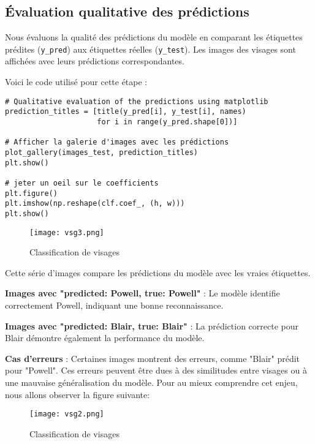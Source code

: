 \documentclass{article}
\begin{document}
\begin{itemize}
\subsection{Évaluation qualitative des prédictions}

Nous évaluons la qualité des prédictions du modèle en comparant les 
étiquettes prédites (\texttt{y\_pred}) aux étiquettes réelles 
(\texttt{y\_test}). Les images des visages sont affichées avec leurs 
prédictions correspondantes.

Voici le code utilisé pour cette étape :

\begin{verbatim}
# Qualitative evaluation of the predictions using matplotlib
prediction_titles = [title(y_pred[i], y_test[i], names)
                     for i in range(y_pred.shape[0])]

# Afficher la galerie d'images avec les prédictions
plot_gallery(images_test, prediction_titles)
plt.show()

# jeter un oeil sur le coefficients 
plt.figure()
plt.imshow(np.reshape(clf.coef_, (h, w)))
plt.show()

\end{verbatim}

\begin{figure}[H]
    \centering
    \begin{minipage}{0.9\textwidth}
        \centering
        \texttt{[image: vsg3.png]}
        \caption{Classification de visages}
    \end{minipage}
    \end{figure} 
Cette série d'images compare les prédictions du modèle avec les vraies
étiquettes.

\textbf{Images avec "predicted: Powell, true: Powell"} : Le modèle 
identifie correctement Powell, indiquant une bonne reconnaissance.

\textbf{Images avec "predicted: Blair, true: Blair"} : La prédiction 
correcte pour Blair démontre également la performance du modèle.

\textbf{Cas d'erreurs} : Certaines images montrent des erreurs, comme 
"Blair" prédit pour "Powell". Ces erreurs peuvent être dues à des 
similitudes entre visages ou à une mauvaise généralisation du modèle.
Pour au mieux comprendre cet enjeu, nous allons observer la figure 
suivante:
  
\begin{figure}[H]
    \centering
    \begin{minipage}{0.9\textwidth}
        \centering
        \texttt{[image: vsg2.png]}
        \caption{Classification de visages}
    \end{minipage}
    \end{figure}
    

\end{itemize}
\end{document}
